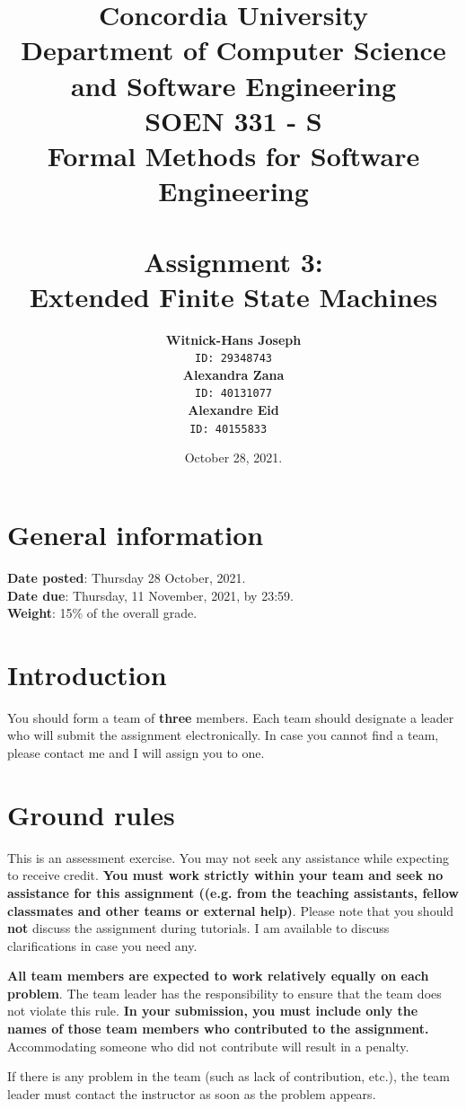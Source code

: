 \documentclass[12pt]{article}
\title{Concordia University\\
Department of Computer Science and Software Engineering\\
\textbf{SOEN 331 - S\\Formal Methods for Software Engineering}\\
\ \\
\textbf{Assignment 3: \\Extended Finite State Machines}}
\author{\textbf{Witnick-Hans Joseph}\\
		\texttt{ID: 29348743}\\
		\textbf{Alexandra Zana}\\
		\texttt{ID: 40131077}\\
		\textbf{Alexandre Eid}\\
		\texttt{ID: 40155833}
\ \\}
\date{October 28, 2021.}
\begin{document}
\maketitle

\newpage
\tableofcontents
\newpage

\section{General information}

\noindent \textbf{Date posted}: Thursday 28 October, 2021.\\
\noindent \textbf{Date due}: Thursday, 11 November, 2021, by 23:59.\\
\noindent \textbf{Weight}: 15\% of the overall grade.

\section{Introduction}
You should form a team of \textbf{three} members. Each team should designate a leader who will submit the assignment electronically. In case you cannot find a team, please contact me and I will assign you to one.

\section{Ground rules}

This is an assessment exercise.  You may not seek any assistance while expecting to receive credit. \textbf{You must work strictly within your team and seek no assistance for this assignment ((e.g. from the teaching assistants, fellow classmates and other teams or external help)}. Please note that you should \textbf{not} discuss the assignment during tutorials. I am available to discuss clarifications in case you need any.

\noindent \textbf{All team members are expected to work relatively equally on each problem}. The team leader has the responsibility to ensure that the team does not violate this rule. \textbf{In your submission, you must include only the names of those team members who contributed to the assignment.} Accommodating someone who did not contribute will result in a penalty.

\noindent If there is any problem in the team (such as lack of contribution, etc.), the team leader must contact the instructor as soon as the problem appears.

\noindent 
\newpage
\end{document}
